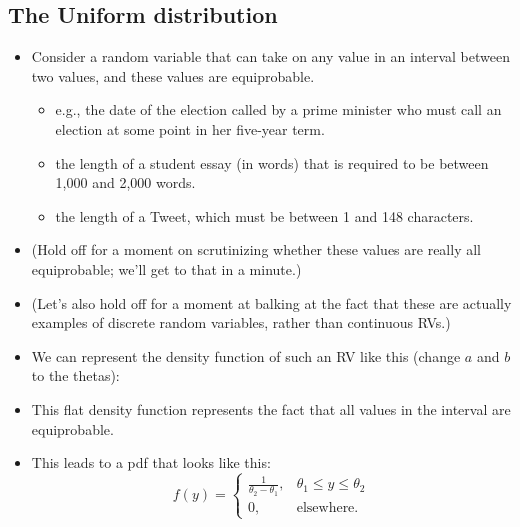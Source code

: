 \documentclass[11pt]{article}
\begin{document}
\subsection{The Uniform distribution}

\begin{itemize}
\item Consider a random variable that can take on any value in an interval
between two values, and these values are equiprobable.

\begin{itemize}
\item e.g., the date of the election called by a prime minister who must
call an election at some point in her five-year term.

\item the length of a student essay (in words) that is required to be
between 1,000 and 2,000 words.

\item the length of a Tweet, which must be between 1 and 148 characters.
\end{itemize}

\item (Hold off for a moment on scrutinizing whether these values are really
all equiprobable; we'll get to that in a minute.)

\item (Let's also hold off for a moment at balking at the fact that these
are actually examples of discrete random variables, rather than continuous
RVs.)

\item We can represent the density function of such an RV like this (change $%
a$ and $b$ to the thetas):

\item This flat density function represents the fact that all values in the
interval are equiprobable.

\item This leads to a pdf that looks like this:%
\begin{equation*}
f\left( y\right) =\left\{ 
\begin{array}{cc}
\frac{1}{\theta _{2}-\theta _{1}}, & \theta _{1}\leq y\leq \theta _{2} \\ 
0, & \text{elsewhere.}%
\end{array}%
\right. 
\end{equation*}


\end{itemize}
\end{document}
